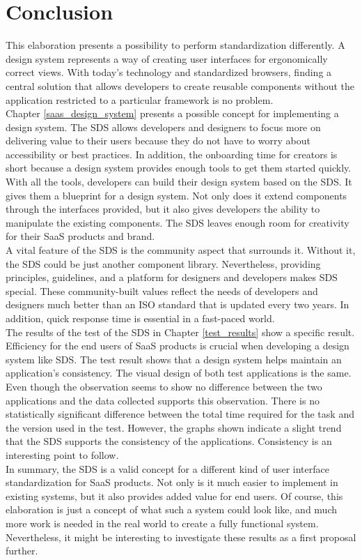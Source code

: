 \newpage
\section{Conclusion}
This elaboration presents a possibility to perform standardization differently. A design system represents a way of creating user interfaces for ergonomically correct views. With today's technology and standardized browsers, finding a central solution that allows developers to create reusable components without the application restricted to a particular framework is no problem.  \\
Chapter \ref{saas_design_system} presents a possible concept for implementing a design system. The \acl{SDS} allows developers and designers to focus more on delivering value to their users because they do not have to worry about accessibility or best practices. In addition, the onboarding time for creators is short because a design system provides enough tools to get them started quickly. \\
With all the tools, developers can build their design system based on the \ac{SDS}. It gives them a blueprint for a design system. Not only does it extend components through the interfaces provided, but it also gives developers the ability to manipulate the existing components. The \ac{SDS} leaves enough room for creativity for their \ac{SaaS} products and brand.\\
A vital feature of the \ac{SDS} is the community aspect that surrounds it. Without it, the \ac{SDS} could be just another component library. Nevertheless, providing principles, guidelines, and a platform for designers and developers makes \ac{SDS} special. These community-built values reflect the needs of developers and designers much better than an ISO standard that is updated every two years. In addition, quick response time is essential in a fast-paced world. \\
The results of the test of the \ac{SDS} in Chapter \ref{test_results} show a specific result. Efficiency for the end users of SaaS products is crucial when developing a design system like SDS. The test result shows that a design system helps maintain an application's consistency. The visual design of both test applications is the same. Even though the observation seems to show no difference between the two applications and the data collected supports this observation. There is no statistically significant difference between the total time required for the task and the version used in the test. However, the graphs shown indicate a slight trend that the \ac{SDS} supports the consistency of the applications. Consistency is an interesting point to follow. \\
In summary, the \ac{SDS} is a valid concept for a different kind of user interface standardization for \ac{SaaS} products. Not only is it much easier to implement in existing systems, but it also provides added value for end users. Of course, this elaboration is just a concept of what such a system could look like, and much more work is needed in the real world to create a fully functional system. Nevertheless, it might be interesting to investigate these results as a first proposal further. 
